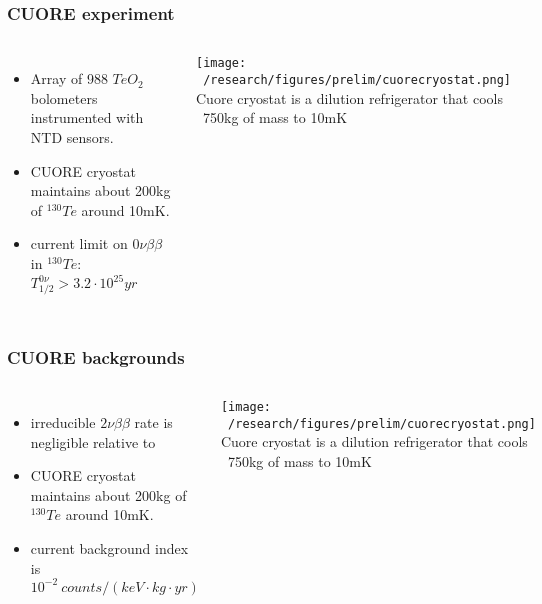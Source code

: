 \documentclass{beamer}
\begin{document}
	\begin{frame}
		\frametitle{CUORE experiment}
		\begin{columns}[c] %
			
			\begin{itemize}
			\item Array of 988 $TeO_2$ bolometers instrumented with NTD sensors.
			\item CUORE	cryostat maintains about 200kg of $^{130}Te$ around 10mK.
			\item current limit on $0\nu\beta\beta$ in $^{130}Te$: $T_{1/2}^{0\nu} > 3.2\cdot 10^{25}yr$ 
			\end{itemize}			 
			
		
			\texttt{[image: ~/research/figures/prelim/cuorecryostat.png]}
			{\footnotesize Cuore cryostat is a dilution refrigerator that cools ~750kg of mass to 10mK }
			
		\end{columns}
	\end{frame}
	
	\begin{frame}
		\frametitle{CUORE backgrounds}
		\begin{columns}[c] %
			
			\begin{itemize}
			\item irreducible $2\nu\beta\beta$ rate is negligible relative to
			\item CUORE	cryostat maintains about 200kg of $^{130}Te$ around 10mK.
			\item current background index is $10^{-2} \ counts/\left(keV\cdot kg\cdot yr\right)$
			\end{itemize}			 
			
		
			\texttt{[image: ~/research/figures/prelim/cuorecryostat.png]}
			{\footnotesize Cuore cryostat is a dilution refrigerator that cools ~750kg of mass to 10mK }
			
		\end{columns}
	\end{frame}	
	
\end{document}
